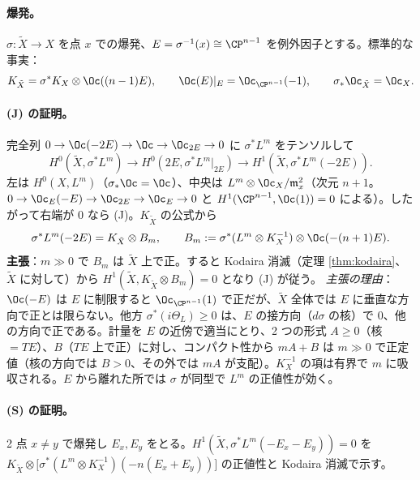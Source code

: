 \paragraph{爆発。}$\sigma:\tilde X\to X$ を点 $x$ での爆発、$E=\sigma^{-1}(x)\cong\CP^{n-1}$ を例外因子とする。標準的な事実\tC：
\[
K_{\tilde X}=\sigma^*K_X\otimes\Oc((n-1)E),\qquad \Oc(E)|_E=\Oc_{\CP^{n-1}}(-1),\qquad \sigma_*\Oc_{\tilde X}=\Oc_X .
\]
\begin{center}
\end{center}
\paragraph{(J) の証明。}完全列 $0\to\Oc(-2E)\to\Oc\to\Oc_{2E}\to0$ に $\sigma^*L^m$ をテンソルして
\[
H^0(\tilde X,\sigma^*L^m)\to H^0(2E,\sigma^*L^m|_{2E})\to H^1(\tilde X,\sigma^*L^m(-2E)).
\]
左は $H^0(X,L^m)$（$\sigma_*\Oc=\Oc$）、中央は $L^m\otimes\Oc_X/\mathfrak m_x^2$（次元 $n+1$。$0\to\Oc_E(-E)\to\Oc_{2E}\to\Oc_E\to0$ と $H^1(\CP^{n-1},\Oc(1))=0$ による）。したがって右端が $0$ なら (J)。$K_{\tilde X}$ の公式から
\[
\sigma^*L^m(-2E)=K_{\tilde X}\otimes B_m,\qquad B_m:=\sigma^*(L^m\otimes K_X^{-1})\otimes\Oc(-(n+1)E).
\]
\textbf{主張}：$m\gg0$ で $B_m$ は $\tilde X$ 上で正。すると Kodaira 消滅（定理 \ref{thm:kodaira}、$\tilde X$ に対して）から $H^1(\tilde X,K_{\tilde X}\otimes B_m)=0$ となり (J) が従う。
\emph{主張の理由}：$\Oc(-E)$ は $E$ に制限すると $\Oc_{\CP^{n-1}}(1)$ で正だが、$\tilde X$ 全体では $E$ に垂直な方向で正とは限らない。他方 $\sigma^*(i\Theta_{L})\ge0$ は、$E$ の接方向（$d\sigma$ の核）で $0$、他の方向で正である。計量を $E$ の近傍で適当にとり、2 つの形式 $A\ge0$（核 $=TE$）、$B$（$TE$ 上で正）に対し、コンパクト性から $mA+B$ は $m\gg0$ で正定値（核の方向では $B>0$、その外では $mA$ が支配）。$K_X^{-1}$ の項は有界で $m$ に吸収される。$E$ から離れた所では $\sigma$ が同型で $L^m$ の正値性が効く。
\paragraph{(S) の証明。}2 点 $x\ne y$ で爆発し $E_x,E_y$ をとる。$H^1(\tilde X,\sigma^*L^m(-E_x-E_y))=0$ を $K_{\tilde X}\otimes\big[\sigma^*(L^m\otimes K_X^{-1})(-n(E_x+E_y))\big]$ の正値性と Kodaira 消滅で示す。
